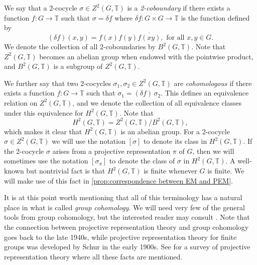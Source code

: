 \documentclass[11pt, oneside, reqno]{amsart}
\newcommand{\bbT}{\mathbb{T}}
\theoremstyle{definition}
\theoremstyle{plain}
\theoremstyle{remark}
\begin{document}
We say that a 2-cocycle $\sigma \in Z^2(G,\bbT)$ is a \emph{2-coboundary} if there exists a function $f \colon G \to \bbT$ such that $\sigma = \delta f$ where $\delta f \colon G \times G \to \bbT$ is the function defined by
\begin{equation*}
    (\delta f)(x,y) = f(x)f(y)\overline{f(xy)}, \text{ for all } x,y \in G.
\end{equation*}
We denote the collection of all 2-coboundaries by $B^2(G,\bbT)$. Note that $Z^2(G,\bbT)$ becomes an abelian group when endowed with the pointwise product, and $B^2(G,\bbT)$ is a subgroup of $Z^2(G,\bbT)$.

We further say that two 2-cocycles $\sigma_1, \sigma_2 \in Z^2(G,\bbT)$ are \emph{cohomologous} if there exists a function $f \colon G \to \bbT$ such that $\sigma_1 = (\delta f) \, \sigma_2$. This defines an equivalence relation on $Z^2(G,\bbT)$, and we denote the collection of all equivalence classes under this equivalence for $H^2(G,\bbT)$. Note that
\begin{equation*}
    H^2(G,\bbT) = Z^2(G,\bbT) / B^2(G,\bbT),
\end{equation*}
which makes it clear that $H^2(G,\bbT)$ is an abelian group. For a 2-cocycle $\sigma \in Z^2(G,\bbT)$ we will use the notation $[\sigma]$ to denote its class in $H^2(G,\bbT)$. If the 2-cocycle $\sigma$ arises from a projective representation $\pi$ of $G$, then we will sometimes use the notation $[\sigma_\pi]$ to denote the class of $\sigma$ in $H^2(G,\bbT)$. A well-known but nontrivial fact is that $H^2(G,\bbT)$ is finite whenever $G$ is finite. We will make use of this fact in \cref{prop:correspondence between EM and PEM}.

It is at this point worth mentioning that all of this terminology has a natural place in what is called \emph{group cohomology}. We will need very few of the general tools from group cohomology, but the interested reader may consult \cite{Brown82}. Note that the connection between projective representation theory and group cohomology goes back to the late 1940s, while projective representation theory for finite groups was developed by Schur in the early 1900s. See \cite{Packer08} for a survey of projective representation theory where all these facts are mentioned.
\end{document}
